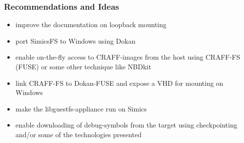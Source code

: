 

\begin{frame}

\frametitle{Recommendations and Ideas}
\begin{itemize}
    \item improve the documentation on loopback mounting
    \item port SimicsFS to Windows using Dokan
    \item enable on-the-fly access to CRAFF-images from the host using CRAFF-FS (FUSE) or some other technique like NBDkit
    \item link CRAFF-FS to Dokan-FUSE and expose a VHD for mounting on Windows
    \item make the libguestfs-appliance run on Simics
    \item enable downloading of debug-symbols from the target using checkpointing and/or some of the technologies presented
\end{itemize}



\end{frame}
